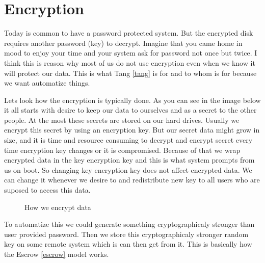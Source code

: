 \documentclass[../xdudla00-porting-Tang-to-Open-WRT.tex]{subfiles}
\begin{document}
\chapter{Encryption}\label{encryption}

Today is common to have a password protected system.
But the encrypted disk requires another password (key) to decrypt.
Imagine that you came home in mood to enjoy your time and your system ask for password not once but twice.
I think this is reason why most of us do not use encryption even when we know it will protect our data.
This is what Tang \ref{tang} is for and to whom is for because we want automatize things.

Lets look how the encryption is typically done.
As you can see in the image below it all starts with desire to keep our data to ourselves and as a secret to the other people.
At the most these secrets are stored on our hard drives.
Usually we encrypt this secret by using an encryption key.
But our secret data might grow in size, and it is time and resource consuming to decrypt and encrypt secret every time encryption key changes or it is compromised.
Because of that we wrap encrypted data in the key encryption key and this is what system prompts from us on boot.
So changing key encryption key does not affect encrypted data.
We can change it whenever we desire to and redistribute new key to all users who are suposed to access this data.

\begin{figure}[h]
    \centering
    \caption{How we encrypt data}
    \label{fig:encdata}
\end{figure}

To automatize this we could generate something cryptographicaly stronger than user provided password.
Then we store this cryptographicaly stronger random key on some remote system which is can then get from it.
This is basically how the Escrow \ref{escrow} model works.
\end{document}
